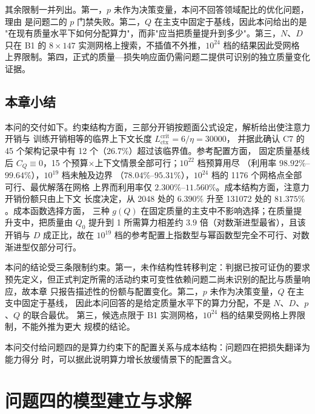 \documentclass[bwprint]{gmcmthesis}
\numberwithin{equation}{section}
\numberwithin{figure}{section}
\numberwithin{table}{section}
\begin{document}
其余限制一并列出。第一，$p$ 未作为决策变量，本问不回答领域配比的优化问题，理由
是问题二的 $p$ 门禁失败。第二，$Q$ 在主支中固定于基线，因此本问给出的是
"在现有质量水平下如何分配算力"，而非"应当把质量提升到多少"。第三，$N$、$D$ 只在
B1 的 $8\times147$ 实测网格上搜索，不插值不外推，$10^{24}$ 档的结果因此受网格
上界限制。第四，正式的质量—损失响应面仍需问题二提供可识别的独立质量变化证据。

\subsection{本章小结}

本问的交付如下。约束结构方面，三部分开销按题面公式设定，解析给出使注意力开销与
训练开销相等的临界上下文长度 $L_{\mathrm{ctx}}^{\mathrm{crit}}=6/\eta=30000$，
并据此确认 C7 的 45 个架构记录中有 12 个（$26.7\%$）超过该临界值。参考配置方面，
固定质量基线后 $C_Q\equiv0$，15 个预算×上下文情景全部可行；$10^{22}$ 档预算用尽
（利用率 $98.92\%$--$99.64\%$），$10^{19}$ 档未触及边界
（$78.04\%$--$95.31\%$），$10^{24}$ 档的 1176 个网格点全部可行、最优解落在网格
上界而利用率仅 $2.300\%$--$11.560\%$。成本结构方面，注意力开销份额只由上下文
长度决定，从 2048 处的 $6.390\%$ 升至 131072 处的 $81.375\%$。成本函数选择方面，
三种 $g(Q)$ 在固定质量的主支中不影响选择；在质量提升支中，把质量由 $Q_0$ 提升到
1 所需算力相差约 $3.9$ 倍（对数渐进型最省），且该开销与 $D$ 成正比，故在
$10^{19}$ 档的参考配置上指数型与幂函数型完全不可行、对数渐进型仅部分可行。

本问的结论受三条限制约束。第一，未作结构性转移判定：判据已按可证伪的要求
预先定义，但正式判定所需的活动约束可变性依赖问题二尚未识别的配比与质量响应，故本章
只报告描述性的份额与配置变化。第二，$p$ 未作为决策变量，$Q$ 在主支中固定于基线，
因此本问回答的是给定质量水平下的算力分配，不是 $N$、$D$、$p$、$Q$ 的联合最优。
第三，候选点限于 B1 实测网格，$10^{24}$ 档的结果受网格上界限制，不能外推为更大
规模的结论。

本问交付给问题四的是算力约束下的配置关系与成本结构：问题四在把损失翻译为能力得分
时，可以据此说明算力增长放缓情景下的配置含义。


\clearpage
\section{问题四的模型建立与求解}

\end{document}
